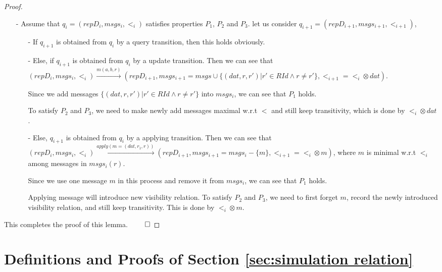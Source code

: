 \begin {proof}
\begin{itemize}
\item[-] Assume that $q_i=(repD_i,msgs_i,<_i)$ satisfies properties $P_1$, $P_2$ and $P_3$. let us consider $q_{i+1}= (repD_{i+1},msgs_{i+1},<_{i+1})$,

    \begin{itemize}
    \setlength{\itemsep}{0.5pt}
    \item[-] If $q_{i+1}$ is obtained from $q_i$ by a query transition, then this holds obviously.

    \item[-] Else, if $q_{i+1}$ is obtained from $q_i$ by a update transition. Then we can see that $(repD_i,msgs_i,<_i) {\xrightarrow{m(a,b,r)}} (repD_{i+1},msgs_{i+1}=msgs \cup \{ (dat,r,r') \vert  r' \in RId \wedge r \neq r' \},<_{i+1} = <_i \otimes dat)$.

        Since we add messages $\{ (dat,r,r') \vert  r' \in RId \wedge r \neq r' \}$ into $msgs_i$, we can see that $P_1$ holds.

        To satisfy $P_2$ and $P_3$, we need to make newly add messages maximal w.r.t $<$ and still keep transitivity, which is done by $<_i \otimes dat$.

    \item[-] Else, $q_{i+1}$ is obtained from $q_i$ by a applying transition. Then we can see that $(repD_i,msgs_i,<_i) {\xrightarrow{apply(m=(dat,r_1,r))}} (repD_{i+1},msgs_{i+1} = msgs_i - \{ m \}, <_{i+1} = <_i \otimes m )$, where $m$ is minimal w.r.t $<_i$ among messages in $msgs_i(r)$.

        Since we use one message $m$ in this process and remove it from $msgs_i$, we can see that $P_1$ holds.

        Applying message will introduce new visibility relation. To satisfy $P_2$ and $P_3$, we need to first forget $m$, record the newly introduced visibility relation, and still keep transitivity. This is done by $<_i \otimes m$.
    \end{itemize}
\end{itemize}

This completes the proof of this lemma. $\qed$
\end {proof}





\section{Definitions and Proofs of Section \ref{sec:simulation relation}}
\label{sec:appendix definitions and proofs of section simulation relation}

